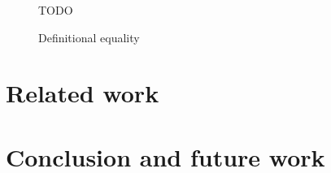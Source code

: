 \documentclass{llncs}
\begin{document}
\begin{figure*}
  \centering
  TODO
  \caption{Definitional equality}
  \label{fig:def-eq}
\end{figure*}

\section{Related work}

\section*{Conclusion and future work}






\end{document}
